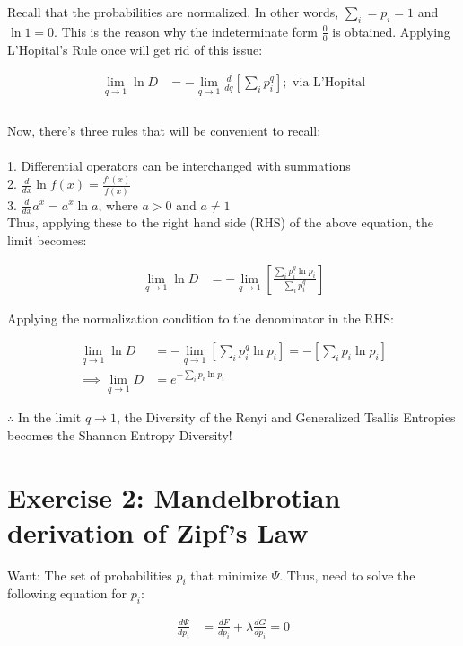 \documentclass{article}
\begin{document}
Recall that the probabilities are normalized. In other words, $\sum_{i} = p_i = 1$ and $\ln{1} = 0$. This is the reason why the indeterminate form $\frac{0}{0}$ is obtained. Applying L'Hopital's Rule once will get rid of this issue:

\begin{align}
\lim_{q\to1} \ln D &=  -\lim_{q\to1} \frac{d}{dq} [\sum_i p_i^q] ; \text{ via L'Hopital} \\
\end{align}
\\
Now, there's three rules that will be convenient to recall: \\
\\
1. Differential operators can be interchanged with summations \\
2. $\frac{d}{dx} \ln f(x) = \frac{f'(x)}{f(x)}$ \\
3. $\frac{d}{dx} a^x = a^x \ln a$, where $a>0$ and $a\neq1$ \\

Thus, applying these to the right hand side (RHS) of the above equation, the limit becomes:

\begin{align}
\lim_{q\to1} \ln D &= -\lim_{q\to1} [\frac{\sum_i p_i^q \ln p_i}{\sum_i p_i^q}]
 \end{align}

Applying the normalization condition to the denominator in the RHS:

\begin{align}
\lim_{q\to1} \ln D &= -\lim_{q\to1}  [\sum_i p_i^q \ln p_i] = - [\sum_i p_i \ln p_i] \\
\implies \lim_{q\to1} D &= e^{- \sum_i p_i \ln p_i}
\end{align}

$\therefore$ In the limit $q\to1$, the Diversity of the Renyi and Generalized Tsallis Entropies becomes the Shannon Entropy Diversity!

\section{Exercise 2: Mandelbrotian derivation of Zipf's Law}

Want: The set of probabilities $p_i$ that minimize $\Psi$. Thus, need to solve the following equation for $p_i$:

\begin{align}
\frac{d\Psi}{dp_i} &= \frac{dF}{dp_i} + \lambda \frac{dG}{dp_i} = 0
\end{align}
\end{document}
